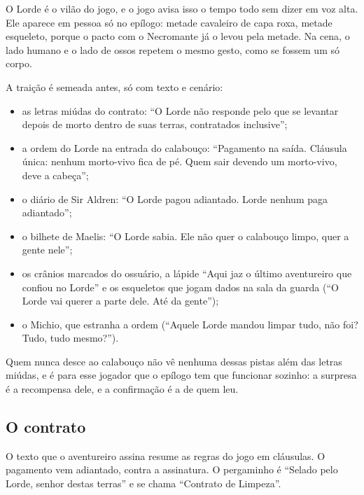 \documentclass[11pt,a4paper]{article}
\begin{document}
O Lorde é o vilão do jogo, e o jogo avisa isso o tempo todo sem dizer em voz alta. Ele aparece em pessoa só no epílogo: metade cavaleiro de capa roxa, metade esqueleto, porque o pacto com o Necromante já o levou pela metade. Na cena, o lado humano e o lado de ossos repetem o mesmo gesto, como se fossem um só corpo.

A traição é semeada antes, só com texto e cenário:
\begin{itemize}
    \item as letras miúdas do contrato: ``O Lorde não responde pelo que se levantar depois de morto dentro de suas terras, contratados inclusive'';
    \item a ordem do Lorde na entrada do calabouço: ``Pagamento na saída. Cláusula única: nenhum morto-vivo fica de pé. Quem sair devendo um morto-vivo, deve a cabeça'';
    \item o diário de Sir Aldren: ``O Lorde pagou adiantado. Lorde nenhum paga adiantado'';
    \item o bilhete de Maelis: ``O Lorde sabia. Ele não quer o calabouço limpo, quer a gente nele'';
    \item os crânios marcados do ossuário, a lápide ``Aqui jaz o último aventureiro que confiou no Lorde'' e os esqueletos que jogam dados na sala da guarda (``O Lorde vai querer a parte dele. Até da gente'');
    \item o Michio, que estranha a ordem (``Aquele Lorde mandou limpar tudo, não foi? Tudo, tudo mesmo?'').
\end{itemize}
Quem nunca desce ao calabouço não vê nenhuma dessas pistas além das letras miúdas, e é para esse jogador que o epílogo tem que funcionar sozinho: a surpresa é a recompensa dele, e a confirmação é a de quem leu.

\subsection{O contrato}

O texto que o aventureiro assina resume as regras do jogo em cláusulas. O pagamento vem adiantado, contra a assinatura. O pergaminho é ``Selado pelo Lorde, senhor destas terras'' e se chama ``Contrato de Limpeza''.
\end{document}
